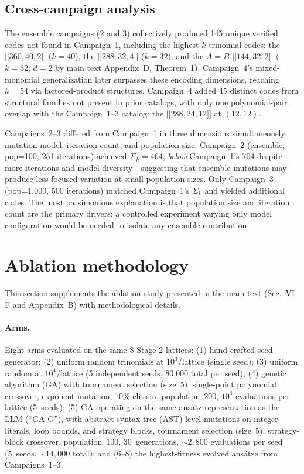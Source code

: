 \documentclass[aps,prxquantum,twocolumn,superscriptaddress,nofootinbib]{revtex4-2}
\newcommand{\dblbrk}[1]{\ensuremath{\lbrack\!\lbrack #1 \rbrack\!\rbrack}}
\newcommand{\code}[1]{\dblbrk{#1}}
\begin{document}
\subsection{Cross-campaign analysis}

The ensemble campaigns (2 and 3) collectively produced 145 unique verified codes not found in Campaign~1, including the highest-$k$ trinomial codes: the $\code{360,40,2}$ ($k = 40$), the $\code{288,32,4}$ ($k = 32$), and the $A = B$ $\code{144,32,2}$ ($k = 32$; $d = 2$ by main text Appendix~D, Theorem~1).
Campaign~4's mixed-monomial generalization later surpasses these encoding dimensions, reaching $k = 54$ via factored-product structures.
Campaign~4 added 45 distinct codes from structural families not present in prior catalogs, with only one polynomial-pair overlap with the Campaign~1--3 catalog: the $\code{288,24,12}$ at $(12,12)$.

Campaigns~2--3 differed from Campaign~1 in three dimensions simultaneously: mutation model, iteration count, and population size.
Campaign~2 (ensemble, pop=100, 251 iterations) achieved $\Sigma_k = 464$, \emph{below} Campaign~1's $704$ despite more iterations and model diversity---suggesting that ensemble mutations may produce less focused variation at small population sizes.
Only Campaign~3 (pop=1{,}000, 500 iterations) matched Campaign~1's $\Sigma_k$ and yielded additional codes.
The most parsimonious explanation is that population size and iteration count are the primary drivers; a controlled experiment varying only model configuration would be needed to isolate any ensemble contribution.

\section{Ablation methodology}
\label{sm:ablation}

This section supplements the ablation study presented in the main text (Sec.~VI\,F and Appendix~B) with methodological details.

\paragraph{Arms.}
Eight arms evaluated on the same 8 Stage-2 lattices:
(1) hand-crafted seed generator;
(2) uniform random trinomials at $10^3$/lattice (single seed);
(3) uniform random at $10^4$/lattice (5 independent seeds, 80{,}000 total per seed);
(4) genetic algorithm (GA) with tournament selection (size~5), single-point polynomial crossover, exponent mutation, 10\% elitism, population~200, $10^4$ evaluations per lattice (5~seeds);
(5) GA operating on the same ansatz representation as the LLM (``GA-G''), with abstract syntax tree (AST)-level mutations on integer literals, loop bounds, and strategy blocks, tournament selection (size~5), strategy-block crossover, population~100, 30~generations, ${\sim}2{,}800$ evaluations per seed (5~seeds, ${\sim}14{,}000$ total);
and (6--8) the highest-fitness evolved ansätze from Campaigns~1--3.
\end{document}
